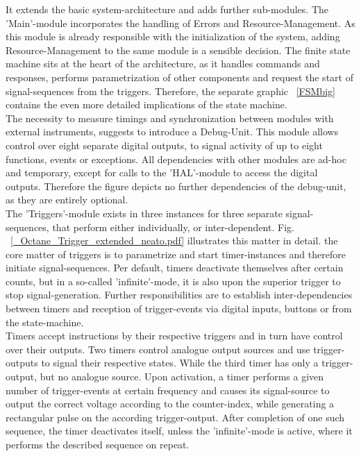 \documentclass[master,english,smartquotes,apa]{hgbthesis}
\begin{document}
		It extends the basic system-architecture and adds further sub-modules. The 'Main'-module incorporates the handling of Errors and Resource-Management. As this module is already responsible with the initialization of the system, adding Resource-Management to the same module is a sensible decision. The finite state machine sits at the heart of the architecture, as it handles commands and responses, performs parametrization of other components and request the start of signal-sequences from the triggers. Therefore, the separate graphic ~\ref{FSMbig} contains the even more detailed implications of the state machine. \\
		
		The necessity to measure timings and synchronization between modules with external instruments, suggests to introduce a Debug-Unit. This module allows control over eight separate digital outputs, to signal activity of up to eight functions, events or exceptions. All dependencies with other modules are ad-hoc and temporary, except for calls to the 'HAL'-module to access the digital outputs. Therefore the figure depicts no further dependencies of the debug-unit, as they are entirely optional. \\
		
		The 'Triggers'-module exists in three instances for three separate signal-sequences, that perform either individually, or inter-dependent. Fig. ~\ref{_Octane_Trigger_extended_neato.pdf} illustrates this matter in detail. the core matter of triggers is to parametrize and start timer-instances and therefore initiate signal-sequences. Per default, timers deactivate themselves after certain counts, but in a so-called 'infinite'-mode, it is also upon the superior trigger to stop signal-generation. Further responsibilities are to establish inter-dependencies between timers and reception of trigger-events via digital inputs, buttons or from the state-machine. \\
		
		Timers accept instructions by their respective triggers and in turn have control over their outputs. Two timers control analogue output sources and use trigger-outputs to signal their respective states. While the third timer has only a trigger-output, but no analogue source. Upon activation, a timer performs a given number of trigger-events at certain frequency and causes its signal-source to output the correct voltage according to the counter-index, while generating a rectangular pulse on the according trigger-output. After completion of one such sequence, the timer deactivates itself, unless the 'infinite'-mode is active, where it performs the described sequence on repeat. \\
		
\end{document}
